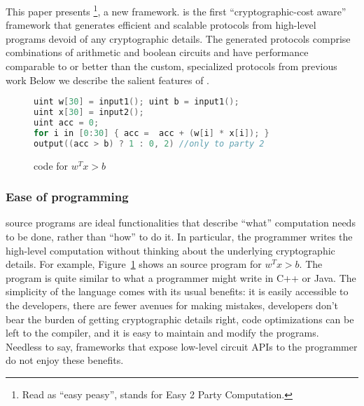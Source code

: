 This paper presents \tool\footnote{Read as ``easy peasy'',
stands for Easy 2 Party Computation.}, a new \mpc framework.
\tool is the first
``cryptographic-cost aware'' framework that generates efficient and
scalable \mpc protocols from high-level programs devoid of any
cryptographic details. The generated protocols comprise combinations
of arithmetic and boolean circuits and have performance comparable to
or better than the custom, specialized
protocols from previous work %
Below we describe
the salient features of \tool.

\begin{figure}
\begin{lstlisting}[language=C]
uint w[30] = input1(); uint b = input1();
uint x[30] = input2();
uint acc = 0;
for i in [0:30] { acc =  acc + (w[i] * x[i]); }
output((acc > b) ? 1 : 0, 2) //only to party 2
\end{lstlisting}
\caption{\tool code for $w^Tx >b$}
\label{fig:ex-sml}
\end{figure}

\subsubsection*{Ease of programming} \tool source programs are ideal
functionalities that describe ``what'' computation needs to be done,
rather than ``how'' to do it. In particular, the programmer writes the
high-level computation without thinking about the underlying
cryptographic details. For example, Figure~\ref{fig:ex-sml}
shows an \tool source
program for $w^Tx >b$.
%
%
The program is quite similar to what a programmer might
write in C++ or Java. The simplicity of the
language comes with its usual benefits: it is easily accessible to the
developers, there are fewer avenues for making mistakes, developers
don't bear the burden of getting cryptographic details right, 
code optimizations can be left to the compiler,
and it
is easy to maintain and modify the programs. Needless to say,
frameworks that expose low-level circuit APIs to the programmer do not
enjoy these benefits.

